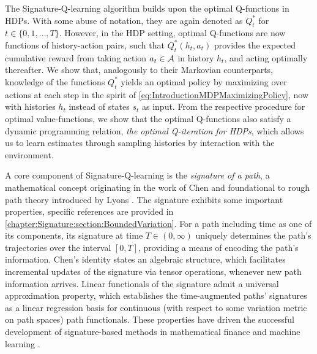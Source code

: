 \documentclass[
    a4paper,
    11pt,
    bibliography=totoc,
    listof=totoc,      
    headinclude=true,
    cleardoublepage=empty,
]{scrbook}
\theoremstyle{plain}
\theoremstyle{definition}
\theoremstyle{remark}
\newcommand{\SpaceA}{{\cal A}}
\begin{document}
The Signature-Q-learning algorithm builds upon the optimal Q-functions in HDPs. With some abuse of notation, they are again
denoted as $Q^*_t$ for $t\in\{0,1,\dots,T\}$. However, in the HDP setting, optimal Q-functions are now 
functions of history-action pairs, such that $Q^*_t(h_t, a_t)$ provides the 
expected cumulative reward from taking action $a_t\in\SpaceA$ in history $h_t$, 
and acting optimally thereafter. We show that, analogously to their Markovian
counterparts, knowledge of the functions $Q_t^*$ yields an optimal policy by 
maximizing over actions at each step in the spirit of 
\eqref{eq:IntroductionMDPMaximizingPolicy}, now with histories $h_t $ instead of 
states $s_t$ as input. From the respective procedure for optimal 
value-functions, we show that the optimal Q-functions also satisfy a dynamic 
programming relation, \textit{the optimal Q-iteration for HDPs}, which allows 
us to learn estimates through sampling histories by interaction with the 
environment.

A core component of Signature-Q-learning is the \textit{signature of a path}, 
a mathematical concept originating in the work of Chen 
\cite{chen1957_ipgigbhf,chen1977_ipi} and foundational to rough path theory 
introduced by Lyons \cite{lyons1998_dedrs,lyons2007_dedrp}. The signature 
exhibits some important 
properties, specific references are provided in \cref{chapter:Signature:section:BoundedVariation}. For a path including time as one of its components, its signature at time $T\in(0,\infty)$ uniquely 
determines the path's trajectories over the interval $[0,T]$, providing a 
means of encoding the path's information. Chen's identity 
states an algebraic structure, which facilitates incremental updates of the 
signature via tensor operations, whenever new path information arrives. Linear functionals of the signature admit a universal approximation property, which establishes the 
time-augmented paths' signatures as a linear regression basis for continuous (with respect to some variation metric on path spaces)
path functionals.
These properties have driven the successful development of signature-based 
methods in mathematical finance 
\cite{akyildirim2022_asmmad,bayer2021_osws,cuchiero2023_smtc,
    kalsi2020_oewrps,lyons2020_nphed,min2021_sdfpmfgwcn} 
and machine learning 
\cite{xie2018_lscwfcrnohctr,lyons1998_dedrs,li2019_sgrusfclwpsfttm,
    min2021_sdfpmfgwcn}.  
\end{document}
